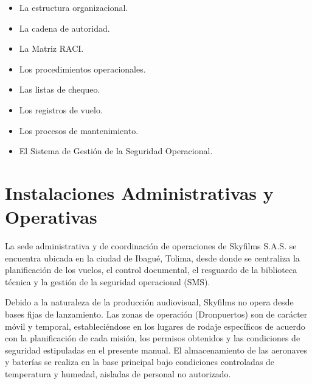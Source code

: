 \begin{itemize}

\item La estructura organizacional.

\item La cadena de autoridad.

\item La Matriz RACI.

\item Los procedimientos operacionales.

\item Las listas de chequeo.

\item Los registros de vuelo.

\item Los procesos de mantenimiento.

\item El Sistema de Gestión de la Seguridad Operacional.

\end{itemize}

\section{Instalaciones Administrativas y Operativas}
La sede administrativa y de coordinación de operaciones de Skyfilms S.A.S. se encuentra ubicada en la ciudad de Ibagué, Tolima, desde donde se centraliza la planificación de los vuelos, el control documental, el resguardo de la biblioteca técnica y la gestión de la seguridad operacional (SMS).

Debido a la naturaleza de la producción audiovisual, Skyfilms no opera desde bases fijas de lanzamiento. Las zonas de operación (Dronpuertos) son de carácter móvil y temporal, estableciéndose en los lugares de rodaje específicos de acuerdo con la planificación de cada misión, los permisos obtenidos y las condiciones de seguridad estipuladas en el presente manual. El almacenamiento de las aeronaves y baterías se realiza en la base principal bajo condiciones controladas de temperatura y humedad, aisladas de personal no autorizado.
